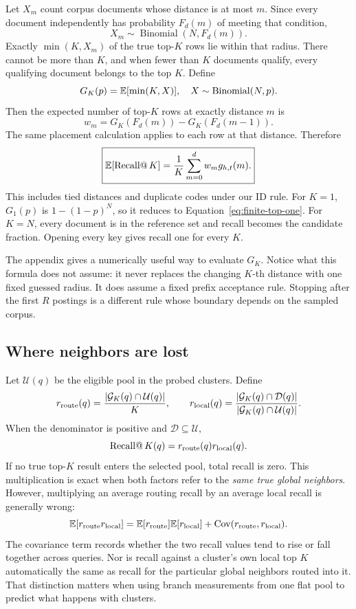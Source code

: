 Let $X_m$ count corpus documents whose distance is at most $m$. Since every document independently
has probability $F_d(m)$ of meeting that condition,
\[
X_m\sim\operatorname{Binomial}(N,F_d(m)).
\]
Exactly $\min(K,X_m)$ of the true top-$K$ rows lie within that radius. There cannot be more
than $K$, and when fewer than $K$ documents qualify, every qualifying document belongs to the
top $K$. Define
\begin{equation}
G_K(p)=\mathbb E[\min(K,X)],\quad X\sim\operatorname{Binomial}(N,p).
\label{eq:clipped-binomial}
\end{equation}
Then the expected number of top-$K$ rows at exactly distance $m$ is
\[
w_m=G_K(F_d(m))-G_K(F_d(m-1)).
\]
The same placement calculation applies to each row at that distance. Therefore
\begin{equation}
\boxed{\mathbb E[\operatorname{Recall@}K]
=\frac{1}{K}\sum_{m=0}^{d}w_m g_{h,t}(m).}
\label{eq:finite-top-k}
\end{equation}
This includes tied distances and duplicate codes under our ID rule. For $K=1$, $G_1(p)$ is
$1-(1-p)^N$, so it reduces to Equation~\eqref{eq:finite-top-one}. For $K=N$, every document is
in the reference set and recall becomes the candidate fraction. Opening every key gives
recall one for every $K$.

The appendix gives a numerically useful way to evaluate $G_K$. Notice what this formula does
not assume: it never replaces the changing $K$-th distance with one fixed guessed radius.
It does assume a fixed prefix acceptance rule. Stopping after the first $R$ postings is a
different rule whose boundary depends on the sampled corpus.

\subsection{Where neighbors are lost}
Let $\mathcal U(q)$ be the eligible pool in the probed clusters. Define
\[
r_{\rm route}(q)=\frac{|\mathcal G_K(q)\cap\mathcal U(q)|}{K},\qquad
r_{\rm local}(q)=\frac{|\mathcal G_K(q)\cap\mathcal D(q)|}
 {|\mathcal G_K(q)\cap\mathcal U(q)|}.
\]
When the denominator is positive and $\mathcal D\subseteq\mathcal U$,
\begin{equation}
\operatorname{Recall@}K(q)=r_{\rm route}(q)r_{\rm local}(q).
\label{eq:recall-stages}
\end{equation}
If no true top-$K$ result enters the selected pool, total recall is zero. This multiplication is
exact when both factors refer to the \emph{same true global neighbors}. However, multiplying
an average routing recall by an average local recall is generally wrong:
\[
\mathbb E[r_{\rm route}r_{\rm local}]
=\mathbb E[r_{\rm route}]\mathbb E[r_{\rm local}]+\operatorname{Cov}(r_{\rm route},r_{\rm local}).
\]
The covariance term records whether the two recall values tend to rise or fall together across queries.
Nor is recall against a cluster's own local top $K$ automatically the same as recall for the
particular global neighbors routed into it. That distinction matters when using branch measurements from one flat pool to predict
what happens with clusters.

